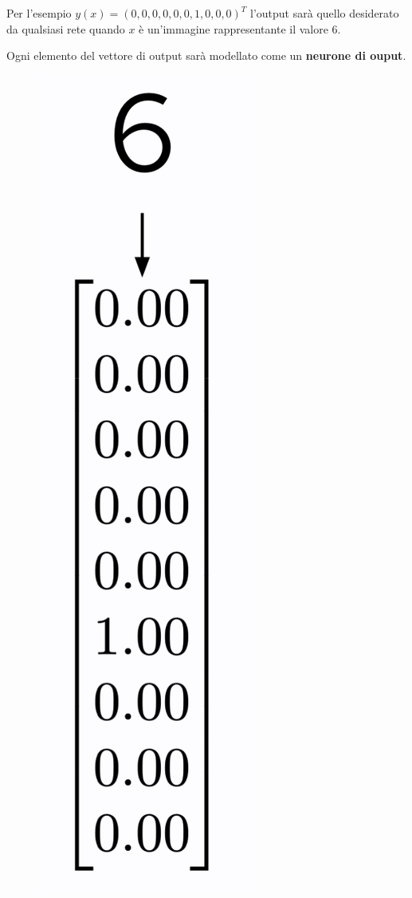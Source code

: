 Per l’esempio $y(x)=(0,0,0,0,0,0,1,0,0,0)^T$ l’output sarà quello desiderato da qualsiasi rete quando $x$ è un’immagine rappresentante il valore $6$.



Ogni elemento del vettore di output sarà modellato come un \textbf{neurone di ouput}.
\begin{figure}[!h]
    \includegraphics[scale=.35]{images/gradient_descent/output_layer.png}
    \centering
\end{figure}
